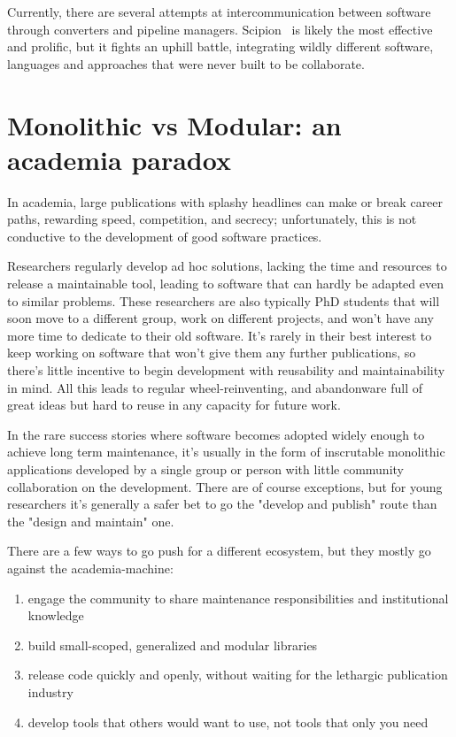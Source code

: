 Currently, there are several attempts at intercommunication between software through converters and pipeline managers.
Scipion~\cite{delarosa-trevinScipionSoftwareFramework2016} is likely the most effective and prolific, but it fights an uphill battle, integrating wildly different software, languages and approaches that were never built to be collaborate.

\section{Monolithic vs Modular: an academia paradox}

In academia, large publications with splashy headlines can make or break career paths, rewarding speed, competition, and secrecy; unfortunately, this is not conductive to the development of good software practices.

Researchers regularly develop ad hoc solutions, lacking the time and resources to release a maintainable tool, leading to software that can hardly be adapted even to similar problems.
These researchers are also typically PhD students that will soon move to a different group, work on different projects, and won't have any more time to dedicate to their old software.
It's rarely in their best interest to keep working on software that won't give them any further publications, so there's little incentive to begin development with reusability and maintainability in mind. 
All this leads to regular wheel-reinventing, and abandonware full of great ideas but hard to reuse in any capacity for future work.

In the rare success stories where software becomes adopted widely enough to achieve long term maintenance, it's usually in the form of inscrutable monolithic applications developed by a single group or person with little community collaboration on the development.
There are of course exceptions, but for young researchers it's generally a safer bet to go the "develop and publish" route than the "design and maintain" one.

There are a few ways to go push for a different ecosystem, but they mostly go against the academia-machine:

\begin{enumerate}
    \item engage the community to share maintenance responsibilities and institutional knowledge
    \item build small-scoped, generalized and modular libraries
    \item release code quickly and openly, without waiting for the lethargic publication industry
    \item develop tools that others would want to use, not tools that only you need
\end{enumerate}

